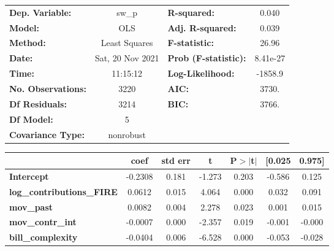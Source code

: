 \begin{center}
\begin{tabular}{lclc}
\toprule
\textbf{Dep. Variable:}           &      sw\_p       & \textbf{  R-squared:         } &     0.040   \\
\textbf{Model:}                   &       OLS        & \textbf{  Adj. R-squared:    } &     0.039   \\
\textbf{Method:}                  &  Least Squares   & \textbf{  F-statistic:       } &     26.96   \\
\textbf{Date:}                    & Sat, 20 Nov 2021 & \textbf{  Prob (F-statistic):} &  8.41e-27   \\
\textbf{Time:}                    &     11:15:12     & \textbf{  Log-Likelihood:    } &   -1858.9   \\
\textbf{No. Observations:}        &        3220      & \textbf{  AIC:               } &     3730.   \\
\textbf{Df Residuals:}            &        3214      & \textbf{  BIC:               } &     3766.   \\
\textbf{Df Model:}                &           5      & \textbf{                     } &             \\
\textbf{Covariance Type:}         &    nonrobust     & \textbf{                     } &             \\
\bottomrule
\end{tabular}
\begin{tabular}{lcccccc}
                                  & \textbf{coef} & \textbf{std err} & \textbf{t} & \textbf{P$> |$t$|$} & \textbf{[0.025} & \textbf{0.975]}  \\
\midrule
\textbf{Intercept}                &      -0.2308  &        0.181     &    -1.273  &         0.203        &       -0.586    &        0.125     \\
\textbf{log\_contributions\_FIRE} &       0.0612  &        0.015     &     4.064  &         0.000        &        0.032    &        0.091     \\
\textbf{mov\_past}                &       0.0082  &        0.004     &     2.278  &         0.023        &        0.001    &        0.015     \\
\textbf{mov\_contr\_int}          &      -0.0007  &        0.000     &    -2.357  &         0.019        &       -0.001    &       -0.000     \\
\textbf{bill\_complexity}         &      -0.0404  &        0.006     &    -6.528  &         0.000        &       -0.053    &       -0.028     \\

\end{tabular}
\end{center}
